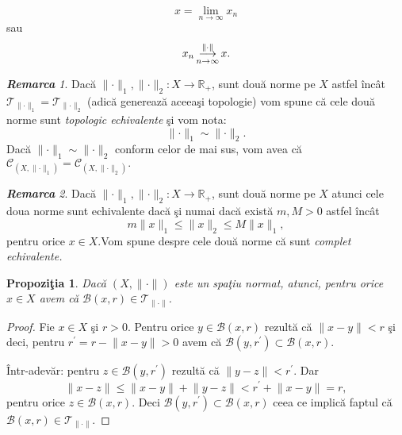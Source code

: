 \documentclass[ a4paper, 12pt]{report}
\newtheorem{prop}[theorem]{\bf Propozi\c tia }
\theoremstyle{definition}
\theoremstyle{remark}
\newtheorem{remarc}{\bf Remarca}[section]
\numberwithin{equation}{section}
\begin{document}
 $$x = \lim\limits_{n \rightarrow \infty} x_n$$ sau $$x_n \pound\limits_{n \rightarrow \infty}^{\lVert \cdot \rVert} x. $$

\begin{remarc}
Dac\u a $\lVert \cdot \rVert_{1},\lVert \cdot \rVert_{2} : X \rightarrow \mathbb{R}_{+}$, sunt dou\u a norme pe $X$ astfel \^inc\^at $\mathcal{T}_{\lVert \cdot \rVert_{1}} = \mathcal{T}_{\lVert \cdot \rVert_{2}}$ (adic\u a genereaz\u a aceea\c si topologie) vom spune c\u a cele dou\u a norme sunt \emph{topologic echivalente} \c si vom nota:
\[ \lVert \cdot \rVert_{1} \sim \lVert \cdot \rVert_{2}. \]
Dac\u a $\lVert \cdot \rVert_{1} \sim \lVert \cdot \rVert_{2}$ conform celor de mai sus, vom avea c\u a  $\mathcal{C}_{(X,\lVert \cdot \rVert_{1})} = \mathcal{C}_{(X,\lVert \cdot \rVert_{2})}.$
\end{remarc}
\begin{remarc}
Dac\u a $\lVert \cdot \rVert_{1},\lVert \cdot \rVert_{2} : X \rightarrow \mathbb{R}_{+}$, sunt dou\u a norme pe $X$ atunci cele doua norme sunt echivalente dac\u a \c si numai dac\u a
 exist\u a $ m, M>0$ astfel \^inc\^at $$ m \lVert x \rVert_{1} \leq \lVert x \rVert_{2} \leq M \lVert x \rVert_{1},$$  pentru orice $ x \in X$.Vom spune despre cele dou\u a norme c\u a sunt \emph{complet echivalente.}

\end{remarc}
\begin{prop}
Dac\u a $(X, \lVert \cdot \rVert)$ este un spa\c tiu normat, atunci, pentru orice $x \in X$ avem c\u a
 $\mathcal{B}(x,r) \in \mathcal{T}_{\lVert \cdot \rVert}$.
\end{prop}
\begin{proof}
Fie $x \in X$ \c si $ r>0.$ Pentru orice $y \in \mathcal{B}(x,r)$ rezult\u a c\u a $ \lVert x-y \rVert < r $ \c si deci, pentru $r^{'} = r - \lVert x-y \rVert>0$ avem c\u a $\mathcal{B}(y,r^{'}) \subset \mathcal{B}(x,r).$

\^Intr-adev\u ar: pentru $z \in \mathcal{B}(y,r^{'})$ rezult\u a c\u a
 $\lVert y-z \rVert < r^{'}$. Dar
 $$\lVert x-z \rVert \leq \lVert x-y \rVert + \lVert y-z \rVert
  < r^{'} +\lVert x-y \rVert = r,$$ pentru orice $ z \in \mathcal{B}(x,r)$. Deci $ \mathcal{B}(y,r^{'}) \subset \mathcal{B}(x,r)$ ceea ce implic\u a faptul c\u a $ \mathcal{B}(x,r) \in \mathcal{T}_{\lVert \cdot \rVert}.$
\end{proof}
\end{document}
